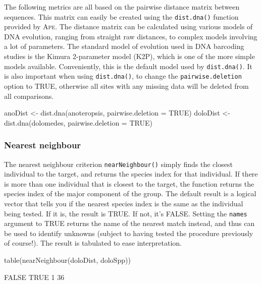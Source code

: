 \documentclass{article}
\newcommand{\progname}[1]{\textsc{#1}}
\newcommand{\fun}[1]{\texttt{#1}}
\begin{document}
The following metrics are all based on the pairwise distance matrix between sequences. This matrix can easily be created using the \fun{dist.dna()} function provided by \progname{Ape}. The distance matrix can be calculated using various models of DNA evolution, ranging from straight raw distances, to complex models involving a lot of parameters. The standard model of evolution used in DNA barcoding studies is the Kimura 2-parameter model (K2P), which is one of the more simple models available. Conveniently, this is the default model used by \fun{dist.dna()}. It is also important when using \fun{dist.dna()}, to change the  \fun{pairwise.deletion} option to TRUE, otherwise all sites with any missing data will be deleted from all comparisons.

\begin{console}
anoDist <- dist.dna(anoteropsis, pairwise.deletion = TRUE)
doloDist <- dist.dna(dolomedes, pairwise.deletion = TRUE)
\end{console}

\subsubsection{Nearest neighbour}
The nearest neighbour criterion \fun{nearNeighbour()} simply finds the closest individual to the target, and returns the species index for that individual. If there is more than one individual that is closest to the target, the function returns the species index of the major component of the group. The default result is a logical vector that tells you if the nearest species index is the same as the individual being tested. If it is, the result is TRUE. If not, it's FALSE. Setting the \fun{names} argument to TRUE returns the name of the nearest match instead, and thus can be used to identify unknowns (subject to having tested the procedure previously of course!). The result is tabulated to ease interpretation.

\begin{console}
table(nearNeighbour(doloDist, doloSpp))
\end{console}

\begin{Routput}
FALSE  TRUE 
    1    36 
\end{Routput}
\end{document}
